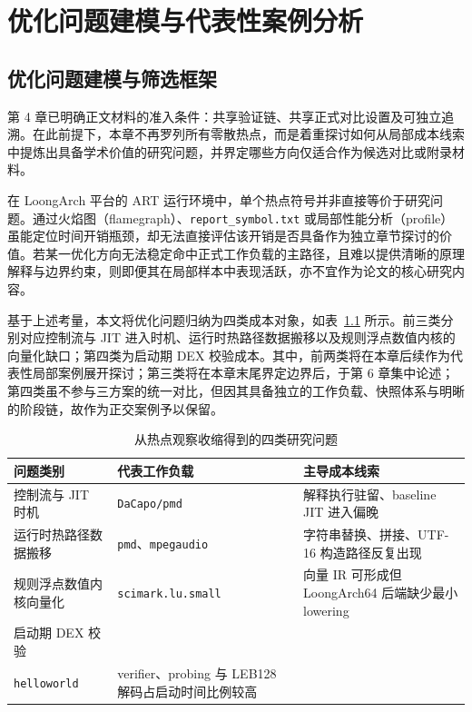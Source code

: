 \chapter{优化问题建模与代表性案例分析}\label{chap:selection}

\section{优化问题建模与筛选框架}

第 4 章已明确正文材料的准入条件：共享验证链、共享正式对比设置及可独立追溯。在此前提下，本章不再罗列所有零散热点，而是着重探讨如何从局部成本线索中提炼出具备学术价值的研究问题，并界定哪些方向仅适合作为候选对比或附录材料。

在 LoongArch 平台的 ART 运行环境中，单个热点符号并非直接等价于研究问题。通过火焰图（flamegraph）、\texttt{report\_symbol.txt} 或局部性能分析（profile）虽能定位时间开销瓶颈，却无法直接评估该开销是否具备作为独立章节探讨的价值。若某一优化方向无法稳定命中正式工作负载的主路径，且难以提供清晰的原理解释与边界约束，则即便其在局部样本中表现活跃，亦不宜作为论文的核心研究内容。

基于上述考量，本文将优化问题归纳为四类成本对象，如表~\ref{tab:problem-modeling-axes} 所示。前三类分别对应控制流与 JIT 进入时机、运行时热路径数据搬移以及规则浮点数值内核的向量化缺口；第四类为启动期 DEX 校验成本。其中，前两类将在本章后续作为代表性局部案例展开探讨；第三类将在本章末尾界定边界后，于第 6 章集中论述；第四类虽不参与三方案的统一对比，但因其具备独立的工作负载、快照体系与明晰的阶段链，故作为正交案例予以保留。

\begin{table}[htbp]
    \centering
    \small
    \caption{从热点观察收缩得到的四类研究问题}
    \label{tab:problem-modeling-axes}
    \begin{tabular}{>{\raggedright\arraybackslash}p{3.0cm}>{\raggedright\arraybackslash}p{2.7cm}>{\raggedright\arraybackslash}p{6.0cm}}
        \toprule
        \textbf{问题类别} & \textbf{代表工作负载} & \textbf{主导成本线索} \\
        \midrule
        控制流与 JIT 时机 & \texttt{DaCapo/pmd} & 解释执行驻留、baseline JIT 进入偏晚 \\
        运行时热路径数据搬移 & \texttt{pmd}、\texttt{mpegaudio} & 字符串替换、拼接、UTF-16 构造路径反复出现 \\
        规则浮点数值内核向量化 & \texttt{scimark.lu.small} & 向量 IR 可形成但 LoongArch64 后端缺少最小 lowering \\
        启动期 DEX 校验 & \shortstack[l]{\texttt{startup.}\\\texttt{helloworld}} & verifier、probing 与 LEB128 解码占启动时间比例较高 \\
        \bottomrule
    \end{tabular}
\end{table}

